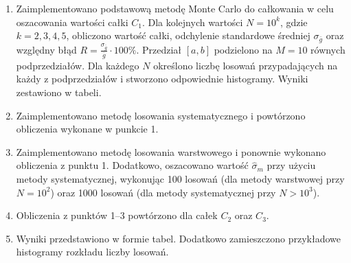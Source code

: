 \documentclass[a4paper,12pt,twoside]{article}
\begin{document}
\begin{enumerate}
    \item Zaimplementowano podstawową metodę Monte Carlo do całkowania w celu oszacowania wartości całki $C_1$. Dla kolejnych wartości $N = 10^k$, gdzie $k = 2, 3, 4, 5$, obliczono wartość całki, odchylenie standardowe średniej $\sigma_{\bar{g}}$ oraz względny błąd $R = \frac{\sigma_{\bar{g}}}{\bar{g}} \cdot 100\%$. Przedział $[a, b]$ podzielono na $M = 10$ równych podprzedziałów. Dla każdego $N$ określono liczbę losowań przypadających na każdy z podprzedziałów i stworzono odpowiednie histogramy. Wyniki zestawiono w tabeli.

    \item Zaimplementowano metodę losowania systematycznego i powtórzono obliczenia wykonane w punkcie 1.

    \item Zaimplementowano metodę losowania warstwowego i ponownie wykonano obliczenia z punktu 1. Dodatkowo, oszacowano wartość $\hat{\sigma}_m$ przy użyciu metody systematycznej, wykonując 100 losowań (dla metody warstwowej przy $N = 10^2$) oraz 1000 losowań (dla metody systematycznej przy $N > 10^3$). 

    \item Obliczenia z punktów 1–3 powtórzono dla całek $C_2$ oraz $C_3$.

    \item Wyniki przedstawiono w formie tabel. Dodatkowo zamieszczono przykładowe histogramy rozkładu liczby losowań.
\end{enumerate}

\vspace{8mm}
\end{document}
